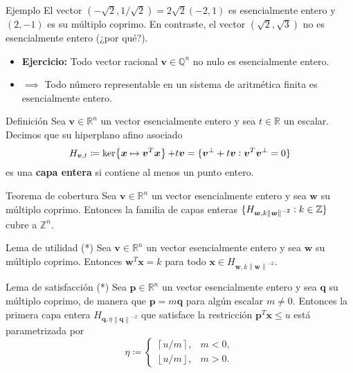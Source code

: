 \documentclass[aspectratio=169,professionalfonts]{beamer}
\newcommand{\Z}{\mathbb{Z}}
\newcommand{\Q}{\mathbb{Q}}
\newcommand{\R}{\mathbb{R}}
\newcommand{\norm}[1]{\left\lVert #1 \right\rVert}
\renewcommand{\ker}[1]{\mathop{\mathrm{ker}{\left\lbrace #1 \right\rbrace}}}
\renewcommand{\vec}[1]{\boldsymbol{#1}}
\newcommand{\braces}[1]{\lbrace #1 \rbrace}
\newcommand{\paren}[1]{\left( #1 \right)}
\newcommand{\clayer}[2]{H_{#1, #2}}
\newcommand{\qlayer}[2]{\clayer{\vec{#1}}{#2\norm{\vec{#1}}^{-2}}}
\newcommand{\floor}[1]{\left\lfloor #1 \right\rfloor}
\newcommand{\ceil}[1]{\left\lceil #1 \right\rceil}
\begin{document}
\begin{frame}
	\begin{block}{Ejemplo}
		El vector $(-\sqrt{2}, 1/\sqrt{2}) = 2\sqrt{2}(-2, 1)$ es
		esencialmente entero y $(2, -1)$ es su múltiplo coprimo. En contraste,
		el vector $\paren{\sqrt{2}, \sqrt{3}}$ no es esencialmente entero (¿por
		qué?).
	\end{block}
	\begin{itemize}
		\item \textbf{Ejercicio:} Todo vector racional $\vec{v} \in \Q^n$ no
			nulo es esencialmente entero.
		\item $\implies$ Todo número representable en un sistema de aritmética
			finita es esencialmente entero.
	\end{itemize}
\end{frame}

\begin{frame}
	\begin{block}{Definición}
		Sea $\vec{v} \in \R^n$ un vector esencialmente entero y sea $t \in \R$ un
		escalar. Decimos que su hiperplano afino asociado
		\begin{equation*}
			\clayer{\vec{v}}{t} \coloneq \ker{\vec{x} \mapsto \vec{v}^T\vec{x}} + t\vec{v}
			= \lbrace \vec{v}^{\perp} + t\vec{v} \vcentcolon \vec{v}^T\vec{v}^{\perp} = 0 \rbrace
		\end{equation*}
		es una \textbf{capa entera} si contiene al menos un punto entero.
	\end{block}
	\begin{block}{Teorema de cobertura}
		Sea $\vec{v} \in \R^n$ un vector esencialmente entero y sea $\vec{w}$ su
		múltiplo coprimo. Entonces la familia de capas enteras
		$\braces{\qlayer{w}{k} \vcentcolon k \in \Z}$ cubre a
		$\Z^n$.
	\end{block}
\end{frame}

\begin{frame}
	\begin{block}{Lema de utilidad (*)}
		Sea $\vec{v} \in \R^n$ un vector esencialmente entero y sea $\vec{w}$ su
		múltiplo coprimo. Entonces $\vec{w}^T\vec{x} = k$ para todo $\vec{x} \in
		\qlayer{w}{k}$.
	\end{block}
	\begin{block}{Lema de satisfacción (*)}
		Sea $\vec{p} \in \R^n$ un vector esencialmente entero y sea $\vec{q}$ su
		múltiplo coprimo, de manera que $\vec{p} = m\vec{q}$ para algún escalar $m
		\neq 0$. Entonces la primera capa entera $\qlayer{q}{\eta}$ que satisface
		la restricción $\vec{p}^T\vec{x} \leq u$ está parametrizada por
		\begin{equation*}
			\label{lemma:eq:eta-cases}
			\eta \coloneq \begin{cases}
				\ceil{u/m}, & m < 0, \\
				\floor{u/m}, & m > 0.
			\end{cases}
		\end{equation*}
	\end{block}
\end{frame}
\end{document}
